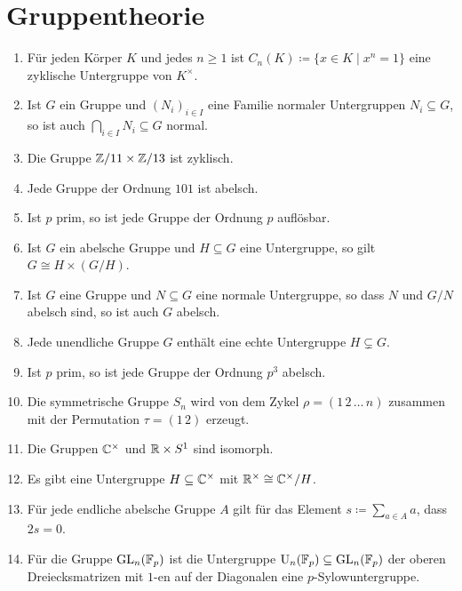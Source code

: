 \section{Gruppentheorie}


\begin{question}[subtitle = Wahr oder Falsch?]
  \begin{enumerate}
    \item
      Für jeden Körper $K$ und jedes $n \geq 1$ ist $C_n(K) \coloneqq \{x \in K \mid x^n = 1\}$ eine zyklische Untergruppe von $K^\times$.
    \item
      Ist $G$ ein Gruppe und $(N_i)_{i \in I}$ eine Familie normaler Untergruppen $N_i \subseteq G$, so ist auch $\bigcap_{i \in I} N_i \subseteq G$ normal.
    \item
      Die Gruppe $\mathbb{Z}/11 \times \mathbb{Z}/13$ ist zyklisch.
    \item
      Jede Gruppe der Ordnung $101$ ist abelsch.
    \item
      Ist $p$ prim, so ist jede Gruppe der Ordnung $p$ auflösbar.
    \item
      Ist $G$ ein abelsche Gruppe und $H \subseteq G$ eine Untergruppe, so gilt $G \cong H \times (G/H)$.
    \item
      Ist $G$ eine Gruppe und $N \subseteq G$ eine normale Untergruppe, so dass $N$ und $G/N$ abelsch sind, so ist auch $G$ abelsch.
    \item
      Jede unendliche Gruppe $G$ enthält eine echte Untergruppe $H \subsetneq G$.
    \item
      Ist $p$ prim, so ist jede Gruppe der Ordnung $p^3$ abelsch.
    \item
      Die symmetrische Gruppe $S_n$ wird von dem Zykel $\rho = (1 \, 2 \, \dotso \, n)$ zusammen mit der Permutation $\tau = (1 \, 2)$ erzeugt.
    \item
      Die Gruppen $\mathbb{C}^\times$ und $\mathbb{R} \times S^1$ sind isomorph.
    \item
      Es gibt eine Untergruppe $H \subseteq \mathbb{C}^\times$ mit $\mathbb{R}^\times \cong \mathbb{C}^\times/H$.
    \item
      Für jede endliche abelsche Gruppe $A$ gilt für das Element $s \coloneqq \sum_{a \in A} a$, dass $2 s = 0$.
    \item
      Für die Gruppe $\operatorname{GL}_n(\mathbb{F}_p)$ ist die Untergruppe $\operatorname{U}_n(\mathbb{F}_p) \subseteq \operatorname{GL}_n(\mathbb{F}_p)$ der oberen Dreiecksmatrizen mit $1$-en auf der Diagonalen eine $p$-Sylow\-unter\-gruppe.
  \end{enumerate}
\end{question}


